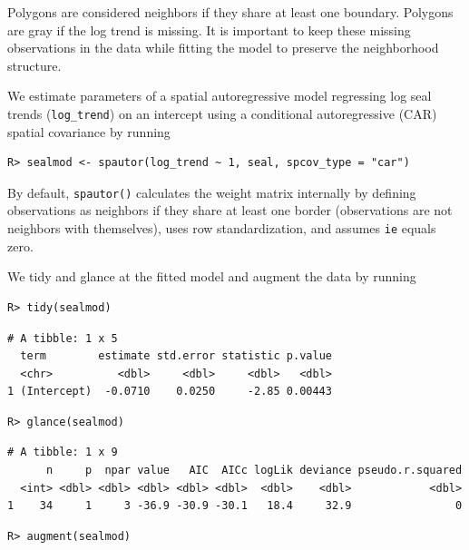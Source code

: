 \documentclass{article}
\begin{document}
Polygons are considered neighbors if they share at least one boundary.
Polygons are gray if the log trend is missing. It is important to keep
these missing observations in the data while fitting the model to
preserve the neighborhood structure.

We estimate parameters of a spatial autoregressive model regressing log
seal trends (\texttt{log\_trend}) on an intercept using a conditional
autoregressive (CAR) spatial covariance by running

\begin{verbatim}
R> sealmod <- spautor(log_trend ~ 1, seal, spcov_type = "car")
\end{verbatim}

By default, \texttt{spautor()} calculates the weight matrix internally
by defining observations as neighbors if they share at least one border
(observations are not neighbors with themselves), uses row
standardization, and assumes \texttt{ie} equals zero.

We tidy and glance at the fitted model and augment the data by running

\begin{verbatim}
R> tidy(sealmod)
\end{verbatim}

\begin{verbatim}
# A tibble: 1 x 5
  term        estimate std.error statistic p.value
  <chr>          <dbl>     <dbl>     <dbl>   <dbl>
1 (Intercept)  -0.0710    0.0250     -2.85 0.00443
\end{verbatim}

\begin{verbatim}
R> glance(sealmod)
\end{verbatim}

\begin{verbatim}
# A tibble: 1 x 9
      n     p  npar value   AIC  AICc logLik deviance pseudo.r.squared
  <int> <dbl> <dbl> <dbl> <dbl> <dbl>  <dbl>    <dbl>            <dbl>
1    34     1     3 -36.9 -30.9 -30.1   18.4     32.9                0
\end{verbatim}

\begin{verbatim}
R> augment(sealmod)
\end{verbatim}
\end{document}
